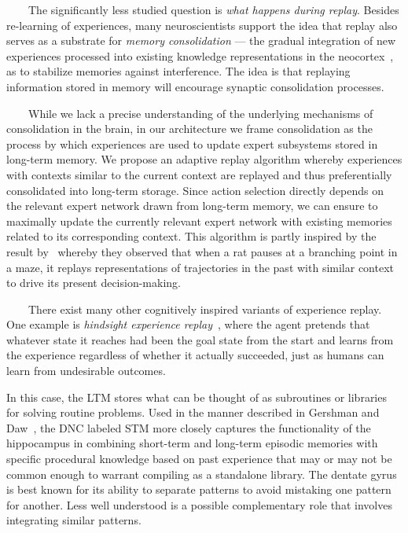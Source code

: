 \documentclass[letterpaper,11pt]{article}
\def\emdash{---}
\begin{document}
\begin{center}
\begin{tcolorbox}[breakable,sharp corners=all,coltitle=black,colbacktitle=white,
    width=\textwidth,boxsep=5pt,left=5pt,right=5pt,
    title={\textbf{Box B: Replaying Experience, Consolidating Memory}}]
~~~~The significantly less studied question is \textit{what happens during replay}. Besides re-learning of experiences, many neuroscientists support the idea that replay also serves as a substrate for \textit{memory consolidation} \emdash{} the gradual integration of new experiences processed into existing knowledge representations in the neocortex~\cite{WilsonandMcNaughtonSCIENCE-94,McClellandetalPR-95,KarlssonandFrankNATURE-NEUROSCIENCE-09,BendorandWilsonNATURE-NEUROSCIENCE-12,KumaranetalTiCS-16}, as to stabilize memories against interference. The idea is that replaying information stored in memory will encourage synaptic consolidation processes. 

~~~~While we lack a precise understanding of the underlying mechanisms of consolidation in the brain, in our architecture we frame consolidation as the process by which experiences are used to update expert subsystems stored in long-term memory. We propose an adaptive replay algorithm whereby experiences with contexts similar to the current context are replayed and thus preferentially consolidated into long-term storage. Since action selection directly depends on the relevant expert network drawn from long-term memory, we can ensure to maximally update the currently relevant expert network with existing memories related to its corresponding context. This algorithm is partly inspired by the result by~\cite{JooandFrankNATURE-REVIEWS-NEUROSCIENCE-18} whereby they observed that when a rat pauses at a branching point in a maze, it replays representations of trajectories in the past with similar context to drive its present decision-making. 

~~~~There exist many other cognitively inspired variants of experience replay. One example is {\textit{hindsight experience replay}}~\cite{AndrychowiczetalCoRR-17}, where the agent pretends that whatever state it reaches had been the goal state from the start and learns from the experience regardless of whether it actually succeeded, just as humans can learn from undesirable outcomes. 

  \end{tcolorbox}
\end{center}

In this case, the LTM stores what can be thought of as subroutines or libraries for solving routine problems. Used in the manner described in Gershman and Daw~\cite{GershmanandDawANNUAL-REVIEWS-17}, the DNC labeled STM more closely captures the functionality of the hippocampus in combining short-term and long-term episodic memories with specific procedural knowledge based on past experience that may or may not be common enough to warrant compiling as a standalone library. The dentate gyrus is best known for its ability to separate patterns to avoid mistaking one pattern for another. Less well understood is a possible complementary role that involves integrating similar patterns.
\end{document}
